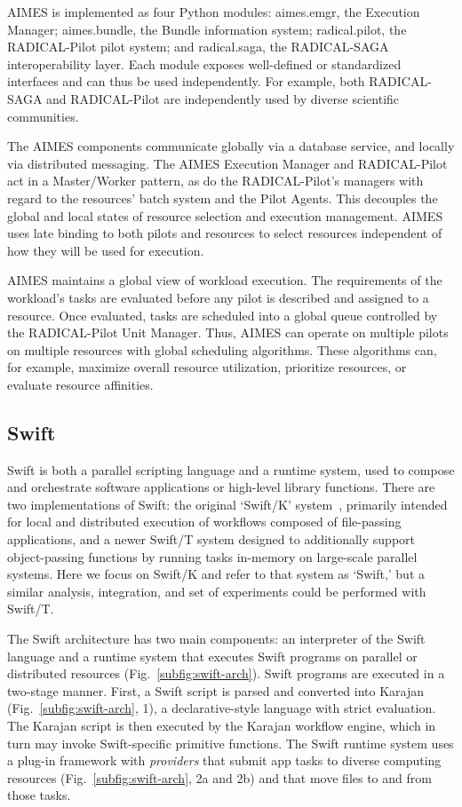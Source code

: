 \documentclass[10pt, conference, compsocconf]{IEEEtran}
\begin{document}
AIMES is implemented as four Python modules: aimes.emgr, the Execution Manager;
aimes.bundle, the Bundle information system; radical.pilot, the RADICAL-Pilot
pilot system; and radical.saga, the RADICAL-SAGA interoperability layer. Each
module exposes well-defined or standardized interfaces and can thus be used
independently. For example, both RADICAL-SAGA and RADICAL-Pilot are
independently used by diverse scientific communities.

The AIMES components communicate globally via a database service, and locally
via distributed messaging. The AIMES Execution Manager and RADICAL-Pilot act in
a Master/Worker pattern, as do the RADICAL-Pilot's managers with regard to the
resources' batch system and the Pilot Agents. This decouples the global and
local states of resource selection and execution management. AIMES uses late
binding to both pilots and resources to select resources independent of how they
will be used for execution.

AIMES maintains a global view of workload execution. The requirements of the
workload's tasks are evaluated before any pilot is described and assigned to a
resource. Once evaluated, tasks are scheduled into a global queue controlled by
the RADICAL-Pilot Unit Manager. Thus, AIMES can operate on multiple pilots on
multiple resources with global scheduling algorithms. These algorithms can, for
example, maximize overall resource utilization, prioritize resources, or
evaluate resource affinities.

\subsection{Swift}\label{subsec:archs-swift}

Swift is both a parallel scripting language and a runtime system, used to
compose and orchestrate software applications or high-level library functions.
There are two implementations of Swift: the original `Swift/K'
system~\cite{wilde2011swift}, primarily intended for local and distributed
execution of workflows composed of file-passing applications, and a newer
Swift/T system designed to additionally support object-passing functions by
running tasks in-memory on large-scale parallel systems. Here we focus on
Swift/K and refer to that system as `Swift,' but a similar analysis,
integration, and set of experiments could be performed with Swift/T.

The Swift architecture has two main components: an interpreter of the Swift
language and a runtime system that executes Swift programs on parallel or
distributed resources (Fig.~\ref{subfig:swift-arch}). Swift programs are
executed in a two-stage manner. First, a Swift script is parsed and converted
into Karajan~\cite{von2007java} (Fig.~\ref{subfig:swift-arch}, 1), a
declarative-style language with strict evaluation. The Karajan script is then
executed by the Karajan workflow engine, which in turn may invoke Swift-specific
primitive functions. The Swift runtime system uses a plug-in framework with
\textit{providers} that submit app tasks to diverse computing resources
(Fig.~\ref{subfig:swift-arch}, 2a and 2b) and that move files to and from those
tasks.
\end{document}

